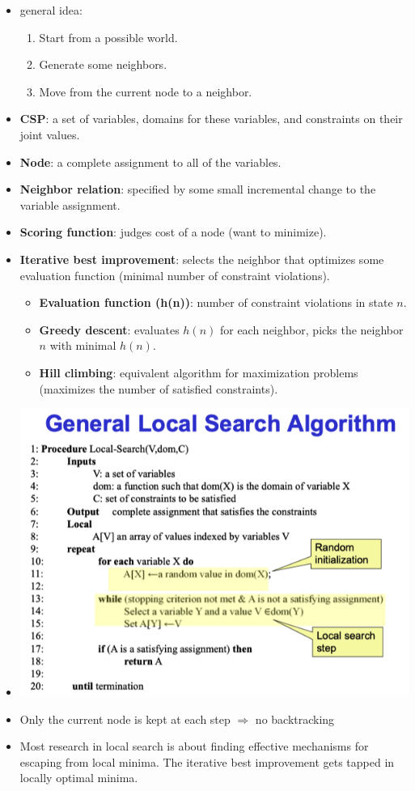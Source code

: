 \documentclass{article}
\begin{document}
\begin{itemize}
    \item general idea:
        \begin{enumerate}
            \item Start from a possible world.
            \item Generate some neighbors.
            \item Move from the current node to a neighbor.
        \end{enumerate}
    \item \textbf{CSP}: a set of variables, domains for these variables, and constraints on their joint values.
    \item \textbf{Node}: a complete assignment to all of the variables.
    \item \textbf{Neighbor relation}: specified by some small incremental change to the variable assignment.
    \item \textbf{Scoring function}: judges cost of a node (want to minimize).
    \item \textbf{Iterative best improvement}: selects the neighbor that optimizes some evaluation function (minimal number of constraint violations).
        \begin{itemize}
            \item \textbf{Evaluation function (h(n))}: number of constraint violations in state $n$.
            \item \textbf{Greedy descent}: evaluates $h(n)$ for each neighbor, picks the neighbor $n$ with minimal $h(n)$.
            \item \textbf{Hill climbing}: equivalent algorithm for maximization problems (maximizes the number of satisfied constraints).
        \end{itemize}
    \item
        \includegraphics[scale=0.6]{general_local_search_algorithm}
    \item Only the current node is kept at each step $\Rightarrow$ no backtracking
    \item Most research in local search is about finding effective mechanisms for escaping from local minima. The iterative best improvement gets tapped in locally optimal minima.
\end{itemize}
\end{document}
